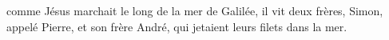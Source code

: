 \encetemps comme Jésus marchait le long de la mer de Galilée,
	il vit deux frères, Simon, appelé Pierre, et son frère André,
	qui jetaient leurs filets dans la mer.
